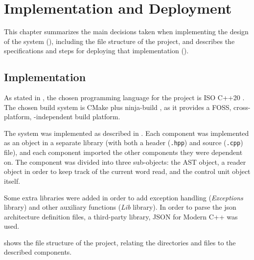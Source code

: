 \chapter{Implementation and Deployment}\label{chap:implementation}
This chapter summarizes the main decisions taken when implementing the design of the system (), including the file structure of the project, and describes the specifications and steps for deploying that implementation ().


\section{Implementation}\label{sec:implementation}
As stated in , the chosen \gls{programming language} for the project is ISO C++20 \parencite{ISOcpp20}. The chosen \gls{build system} is CMake \parencite{cmake} plus ninja-build \parencite{ninja}, as it provides a \gls{FOSS}, cross-platform, -independent build platform.

The system was implemented as described in . Each component was implemented as an object in a separate library (with both a header (\texttt{.hpp}) and source (\texttt{.cpp}) file), and each component imported the other components they were dependent on. The  component was divided into three sub-objects: the \gls{AST} object, a reader object in order to keep track of the current word read, and the control unit object itself.

Some extra libraries were added in order to add exception handling (\textit{Exceptions} library) and other auxiliary functions (\textit{Lib} library). In order to parse the \gls{json} architecture definition files, a third-party library, JSON for Modern C++ \parencite{nlohmann/json} was used.

 shows the file structure of the project, relating the directories and files to the described components.

